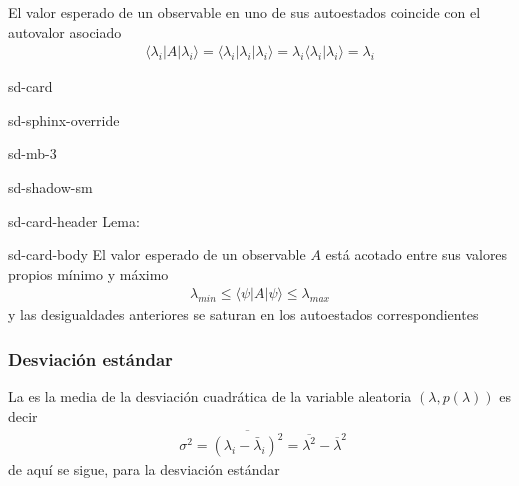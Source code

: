 \documentclass[letterpaper,10pt,english]{jupyterBook}
\newcommand{\bra}[1]{\langle #1|}
\newcommand{\ket}[1]{|#1\rangle}
\newcommand{\braket}[2]{\langle #1|#2\rangle}
\begin{document}
\sphinxAtStartPar
El valor esperado de un observable en uno de sus autoestados coincide con el autovalor asociado
\begin{equation*}
\begin{split}
\bra{\lambda_i}A \ket{\lambda_i} = \bra{\lambda_i}\lambda_i \ket{\lambda_i}  = \lambda_i \braket{\lambda_i}{\lambda_i} = \lambda_i
\end{split}
\end{equation*}
\begin{sphinxuseclass}{sd-card}
\begin{sphinxuseclass}{sd-sphinx-override}
\begin{sphinxuseclass}{sd-mb-3}
\begin{sphinxuseclass}{sd-shadow-sm}
\begin{sphinxuseclass}{sd-card-header}
\sphinxAtStartPar
Lema:

\end{sphinxuseclass}
\begin{sphinxuseclass}{sd-card-body}
\sphinxAtStartPar
El valor esperado de un observable \(A\) está acotado entre sus valores propios mínimo y máximo
\begin{equation*}
\begin{split}
\lambda_{min} \leq \bra{\psi}A\ket{\psi} \leq \lambda_{max}
\end{split}
\end{equation*}
\sphinxAtStartPar
y las desigualdades anteriores se saturan en los autoestados correspondientes

\end{sphinxuseclass}
\end{sphinxuseclass}
\end{sphinxuseclass}
\end{sphinxuseclass}
\end{sphinxuseclass}

\subsubsection{Desviación estándar}
\label{\detokenize{docs/Part_01_Formalismo/Chapter_02_01_Fundamentos_MC_myst:desviacion-estandar}}
\sphinxAtStartPar


\sphinxAtStartPar
La   es la media de la desviación cuadrática de la variable aleatoria \((\lambda,p(\lambda))\) es decir
\begin{equation*}
\begin{split}
~~\sigma ^2 = \overline{(\lambda_i-\bar\lambda_i)^2}= \overline{\lambda^2} - \overline{\lambda}^2
\end{split}
\end{equation*}
\sphinxAtStartPar
de aquí se sigue, para la desviación estándar
\end{document}
